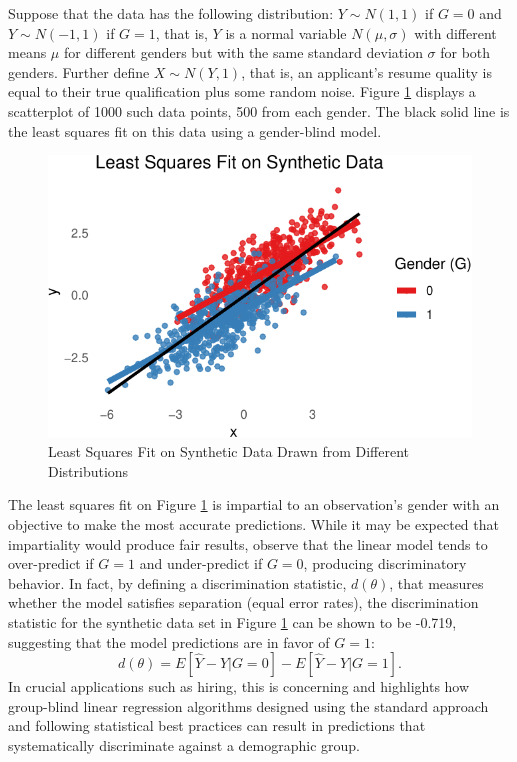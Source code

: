 \documentclass[12pt, twoside]{amherstthesis}
\begin{document}
Suppose that the data has the following distribution: \(Y \sim N(1,1)\) if \(G = 0\) and \(Y \sim N(-1,1)\) if \(G = 1\), that is, \(Y\) is a normal variable \(N(\mu, \sigma)\) with different means \(\mu\) for different genders but with the same standard deviation \(\sigma\) for both genders. Further define \(X \sim N(Y,1)\), that is, an applicant's resume quality is equal to their true qualification plus some random noise. Figure \ref{fig:fig1} displays a scatterplot of 1000 such data points, 500 from each gender. The black solid line is the least squares fit on this data using a gender-blind model.
\begin{figure}

{\centering \includegraphics{Dasha-Asienga_StatThesis_files/figure-latex/fig1-1} 

}

\caption{Least Squares Fit on Synthetic Data Drawn from Different Distributions}\label{fig:fig1}
\end{figure}
The least squares fit on Figure \ref{fig:fig1} is impartial to an observation's gender with an objective to make the most accurate predictions. While it may be expected that impartiality would produce fair results, observe that the linear model tends to over-predict if \(G = 1\) and under-predict if \(G=0\), producing discriminatory behavior. In fact, by defining a discrimination statistic, \(d(\theta)\), that measures whether the model satisfies separation (equal error rates), the discrimination statistic for the synthetic data set in Figure \ref{fig:fig1} can be shown to be -0.719, suggesting that the model predictions are in favor of \(G = 1\):
\begin{equation}
\label{ch2eq4}
d(\theta) =  E[\hat{Y}-Y|G = 0 ] - E[\hat{Y}-Y|G = 1 ]. 
\end{equation}
In crucial applications such as hiring, this is concerning and highlights how group-blind linear regression algorithms designed using the standard approach and following statistical best practices can result in predictions that systematically discriminate against a demographic group.
\end{document}
